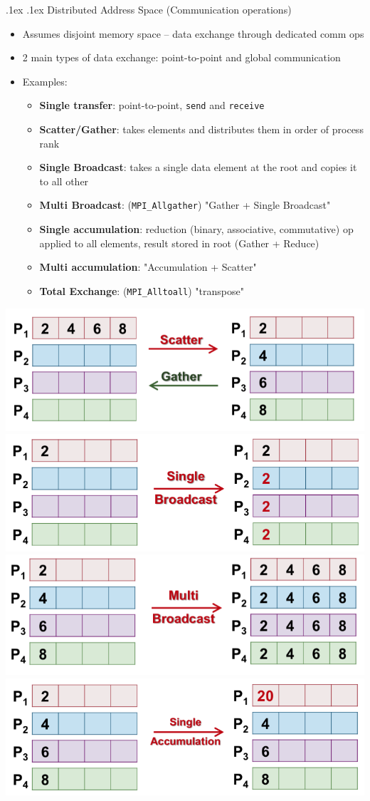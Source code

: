 \documentclass[10pt,landscape,a4paper]{article}
\makeatletter
\renewcommand{\subsubsection}{\@startsection{subsubsection}{1}{0mm}%
  {.1ex}%
  {.1ex}%
{\rmfamily\bfseries}}
\makeatother
\begin{document}
\begin{multicols*}{4}
  \subsubsection{Distributed Address Space (Communication operations)}
  \begin{itemize}
    \item Assumes disjoint memory space -- data exchange through dedicated comm ops
    \item 2 main types of data exchange: point-to-point and global communication
    \item Examples:
          \begin{itemize}
            \item \textbf{Single transfer}: point-to-point, \texttt{send} and \texttt{receive}
            \item \textbf{Scatter/Gather}: takes elements and distributes them in order of process rank
            \item \textbf{Single Broadcast}: takes a single data element at the root and copies it to all other
            \item \textbf{Multi Broadcast}: (\texttt{MPI\_Allgather}) "Gather + Single Broadcast"
            \item \textbf{Single accumulation}: reduction (binary, associative, commutative) op applied to all elements, result stored in root (Gather + Reduce)
            \item \textbf{Multi accumulation}: "Accumulation + Scatter"
            \item \textbf{Total Exchange}: (\texttt{MPI\_Alltoall}) "transpose"
          \end{itemize}
  \end{itemize}
  \includegraphics[width=0.33\linewidth]{scattergather}
  \includegraphics[width=0.33\linewidth]{singlebcast}
  \includegraphics[width=0.33\linewidth]{multibcast}
  \includegraphics[width=0.33\linewidth]{singleaccu}

\end{multicols*}
\end{document}

